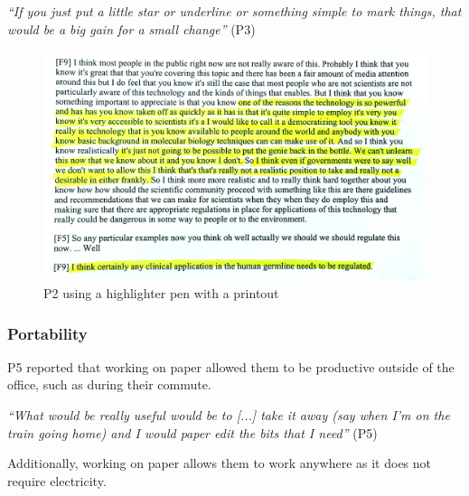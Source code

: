 \textit{``If you just put a little star or underline or something simple to
  mark things, that would be a big gain for a small change''} (P3)




\begin{figure}[t]
\centering
  \includegraphics[width=\columnwidth]{figs/highlighting-cropped.jpg}
  \caption{P2 using a highlighter pen with a printout}
  \label{fig:highlight}
\end{figure}

\subsubsection{Portability}

P5 reported that working on paper allowed them to be productive outside of
the office, such as during their commute.

\textit{``What would be really useful would be to [...] take it away (say when
  I'm on the train going home) and I would paper edit the bits that I need''}
(P5)

Additionally, working on paper allows them to work anywhere as it does not
require electricity.

